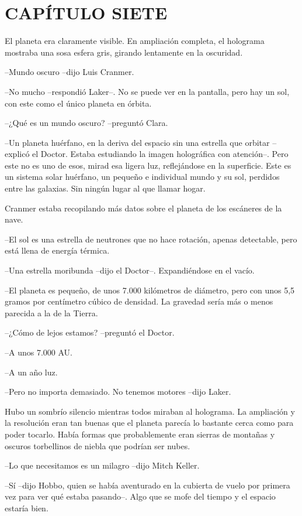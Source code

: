 \chapter*{CAPÍTULO SIETE}

{El planeta era claramente visible. En ampliación completa, el holograma
mostraba una sosa esfera gris, girando lentamente en la oscuridad.}

{--Mundo oscuro --dijo Luis Cranmer.}

{--No mucho --respondió Laker--. No se puede ver en la pantalla, pero hay
un sol, con este como el único planeta en órbita.}

{--¿Qué es un mundo oscuro? --preguntó Clara.}

{--Un planeta huérfano, en la deriva del espacio sin una estrella que
 orbitar --explicó el Doctor. Estaba estudiando la imagen holográfica con
 atención--. Pero este no es uno de esos, mirad esa ligera luz,
 reflejándose en la superficie. Este es un sistema solar huérfano, un
 pequeño e individual mundo y su sol, perdidos entre las galaxias. Sin
ningún lugar al que llamar hogar.}

{Cranmer estaba recopilando más datos sobre el planeta de los escáneres
de la nave.}

{--El sol es una estrella de neutrones que no hace rotación, apenas
detectable, pero está llena de energía térmica.}

{--Una estrella moribunda --dijo el Doctor--. Expandiéndose en el
vacío.}

{--El planeta es pequeño, de unos 7.000 kilómetros de diámetro, pero con
 unos 5,5 gramos por centímetro cúbico de densidad. La gravedad sería más
o menos parecida a la de la Tierra.}

{--¿Cómo de lejos estamos? --preguntó el Doctor.}

{--A unos 7.000 AU.}

{--A un año luz.}

{--Pero no importa demasiado. No tenemos motores --dijo Laker.}

{Hubo un sombrío silencio mientras todos miraban al holograma. La
 ampliación y la resolución eran tan buenas que el planeta parecía lo
 bastante cerca como para poder tocarlo. Había formas que probablemente
 eran sierras de montañas y oscuros torbellinos de niebla que podrían ser
nubes.}

{--Lo que necesitamos es un milagro --dijo Mitch Keller.}

{--Sí --dijo Hobbo, quien se había aventurado en la cubierta de vuelo por
 primera vez para ver qué estaba pasando--. Algo que se mofe del tiempo y
el espacio estaría bien.}

